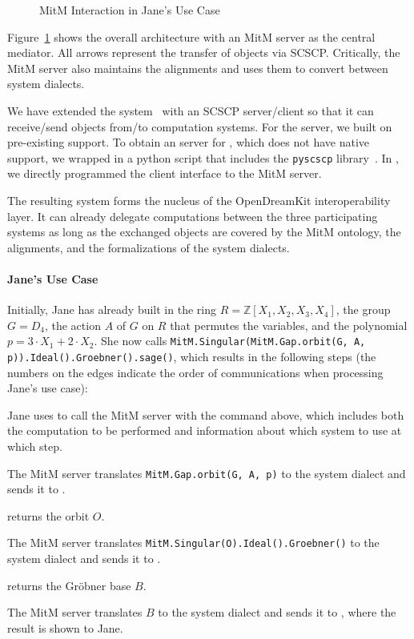 \begin{figure}[ht]\centering\vspace*{-1em}
  \caption{MitM Interaction in Jane's Use Case}\label{fig:mitmpoc}\vspace*{-1em}
\end{figure}

Figure~\ref{fig:mitmpoc} shows the overall architecture with an MitM server as the central mediator.
All arrows represent the transfer of \OMMT objects via SCSCP.
Critically, the MitM server also maintains the alignments and uses them to convert between system dialects.

We have extended the \MMT system~\cite{Rabe:MAGMS13} with an SCSCP server/client so that it can receive/send objects from/to computation systems.
For the \GAP server, we built on pre-existing \SCSCP support.
To obtain an \SCSCP server for \Singular, which does not have native \SCSCP support, we wrapped \Singular in a python script that includes the \lstinline|pyscscp| library~\cite{py-scscp:on}.
In \Sage, we directly programmed the client interface to the MitM server. 

The resulting system forms the nucleus of the OpenDreamKit interoperability layer. It can already delegate computations between the three participating systems as long as the exchanged objects are covered by the MitM ontology, the alignments, and the formalizations of the system dialects.

\paragraph{Jane's Use Case} 
Initially, Jane has already built in \Sage the ring $R=\mathbb{Z}[X_1,X_2,X_3,X_4]$, the group $G=D_4$, the action $A$ of $G$ on $R$ that permutes the variables, and the polynomial $p = 3\cdot X_1 + 2\cdot X_2$.  She now calls \lstinline|MitM.Singular(MitM.Gap.orbit(G, A, p)).Ideal().Groebner().sage()|, which results in the following steps (the numbers on the edges indicate the order of communications when processing Jane's use case):
\begin{compactenum}
  \item Jane uses \Sage to call the MitM server with the command above, which includes both the computation to be performed and information about which system to use at which step.
  \item The MitM server translates \lstinline|MitM.Gap.orbit(G, A, p)| to the \GAP system dialect and sends it to \GAP.
  \item \GAP returns the orbit $O$.
  \item The MitM server translates \lstinline|MitM.Singular(O).Ideal().Groebner()| to the \Singular system dialect and sends it to \Singular.
  \item \Singular returns the Gröbner base $B$.
  \item The MitM server translates $B$ to the \Sage system dialect and sends it to \Sage, where the result is shown to Jane.
\end{compactenum}

